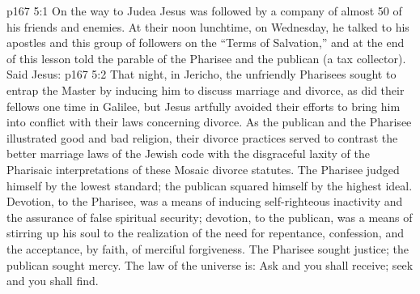 \vs p167 5:1 On the way to Judea Jesus was followed by a company of almost 50 of his friends and enemies. At their noon lunchtime, on Wednesday, he talked to his apostles and this group of followers on the “Terms of Salvation,” and at the end of this lesson told the parable of the Pharisee and the publican (a tax collector). Said Jesus: 
\vs p167 5:2 \pc That night, in Jericho, the unfriendly Pharisees sought to entrap the Master by inducing him to discuss marriage and divorce, as did their fellows one time in Galilee, but Jesus artfully avoided their efforts to bring him into conflict with their laws concerning divorce. As the publican and the Pharisee illustrated good and bad religion, their divorce practices served to contrast the better marriage laws of the Jewish code with the disgraceful laxity of the Pharisaic interpretations of these Mosaic divorce statutes. The Pharisee judged himself by the lowest standard; the publican squared himself by the highest ideal. Devotion, to the Pharisee, was a means of inducing self\hyp{}righteous inactivity and the assurance of false spiritual security; devotion, to the publican, was a means of stirring up his soul to the realization of the need for repentance, confession, and the acceptance, by faith, of merciful forgiveness. The Pharisee sought justice; the publican sought mercy. The law of the universe is: Ask and you shall receive; seek and you shall find.
